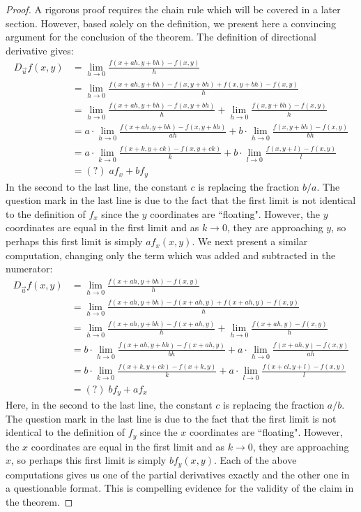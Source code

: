 \documentclass[handout]{ximera}
\begin{document}
\begin{proof}
A rigorous proof requires the chain rule which will be covered in a later section. 
However, based solely on the definition, we present here a convincing argument for the conclusion of the theorem. 
The definition of directional derivative gives:
\begin{align*}
D_{\vec u} f(x,y) &= \lim_{h \to 0} \frac{f(x + ah, y + bh) -f(x,y)}{h} \\
                  &= \lim_{h \to 0} \frac{f(x + ah, y + bh) - f(x , y+ bh) + f(x, y+bh) -f(x,y)}{h} \\
                  &= \lim_{h \to 0} \frac{f(x + ah, y + bh) - f(x , y+ bh)}{h} + \lim_{h \to 0} \frac{f(x , y+ bh) -f(x,y)}{h} \\
                  &= a\cdot \lim_{h \to 0} \frac{f(x + ah, y + bh) - f(x , y+ bh)}{ah} + b\cdot \lim_{h \to 0} \frac{f(x , y+ bh) -f(x,y)}{bh} \\
                  &= a\cdot \lim_{k \to 0} \frac{f(x + k, y + ck) - f(x , y+ ck)}{k} + b\cdot \lim_{l \to 0} \frac{f(x , y+ l) -f(x,y)}{l} \\
                  &= (?) \; a f_x + bf_y
\end{align*}
In the second to the last line, the constant $c$ is replacing the fraction $b/a$.  
The question mark in the last line is due to the fact that the first limit is not
identical to the definition of $f_x$ since the $y$ coordinates are ``floating".  
However, the $y$ coordinates are equal in the first limit and as $k \to 0$, they are approaching $y$, so perhaps this first limit is simply $af_x(x,y)$.
We next present a similar computation, changing only the term which was added and subtracted in the numerator:
\begin{align*}
D_{\vec u} f(x,y) &= \lim_{h \to 0} \frac{f(x + ah, y + bh) -f(x,y)}{h} \\
                  &= \lim_{h \to 0} \frac{f(x + ah, y + bh) - f(x+ah , y) + f(x+ah, y) -f(x,y)}{h} \\
                  &= \lim_{h \to 0} \frac{f(x + ah, y + bh) - f(x+ah, y)}{h} + \lim_{h \to 0} \frac{f(x+ah , y) -f(x,y)}{h} \\
                  &= b\cdot \lim_{h \to 0} \frac{f(x + ah, y + bh) - f(x+ah , y)}{bh} + a\cdot \lim_{h \to 0} \frac{f(x+ah , y) -f(x,y)}{ah} \\
                  &= b\cdot \lim_{k \to 0} \frac{f(x + k, y + ck) - f(x+k , y)}{k} + a\cdot \lim_{l \to 0} \frac{f(x+ cl , y+ l) -f(x,y)}{l} \\
                  &= (?)\;  b f_y + af_x
\end{align*}
Here, in the second to the last line, the constant $c$ is replacing the fraction $a/b$.  
The question mark in the last line is due to the fact that the first limit is not
identical to the definition of $f_y$ since the $x$ coordinates are ``floating".  
However, the $x$ coordinates are equal in the first limit and as $k \to 0$, they are approaching $x$, so perhaps this first limit is simply $bf_y(x,y)$.
Each of the above computations gives us one of the partial derivatives exactly and the other one in a questionable format. 
This is compelling evidence for the validity of the claim in the theorem.
\end{proof}
\end{document}
